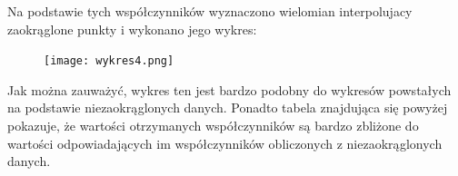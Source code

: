 \documentclass{article}
\begin{document}
	Na podstawie tych współczynników wyznaczono wielomian interpolujacy zaokrąglone punkty i wykonano jego wykres:
	
	
	\begin{figure}[h]
    		\centering
  		\texttt{[image: wykres4.png]}
	\end{figure}
	
	Jak można zauważyć, wykres ten jest bardzo podobny do wykresów powstałych na podstawie niezaokrąglonych danych. Ponadto tabela znajdująca się powyżej pokazuje, że wartości otrzymanych współczynników są bardzo zbliżone do wartości odpowiadających im współczynników obliczonych z niezaokrąglonych danych.
	
	
	
	
	
	
	
	
	
	
	
	
	
	
	
	
	
	
	
	
	
	
	
	
\end{document}
